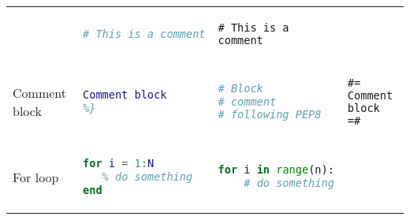 \documentclass[10pt, landscape]{article}
\begin{document}
\begin{multicols}{2}
\begin{tabular}[]{@{}llll@{}}
\begin{minipage}[t]{0.22\columnwidth}
\end{minipage} & \begin{minipage}[t]{0.22\columnwidth}\raggedright
\begin{lstlisting}[language=Python]
# This is a comment
\end{lstlisting}

\end{minipage} & \begin{minipage}[t]{0.25\columnwidth}\raggedright
\begin{lstlisting}
# This is a comment
\end{lstlisting}

\end{minipage}\tabularnewline
\begin{minipage}[t]{0.19\columnwidth}\raggedright
Comment block
\end{minipage} & \begin{minipage}[t]{0.22\columnwidth}\raggedright
\begin{lstlisting}[language=Matlab]
%{
Comment block
%}
\end{lstlisting}

\end{minipage} & \begin{minipage}[t]{0.22\columnwidth}\raggedright
\begin{lstlisting}[language=Python]
# Block
# comment
# following PEP8
\end{lstlisting}

\end{minipage} & \begin{minipage}[t]{0.25\columnwidth}\raggedright
\begin{lstlisting}
#=
Comment block
=#
\end{lstlisting}

\end{minipage}\tabularnewline
\begin{minipage}[t]{0.19\columnwidth}\raggedright
For loop
\end{minipage} & \begin{minipage}[t]{0.22\columnwidth}\raggedright
\begin{lstlisting}[language=Matlab]
for i = 1:N
   % do something
end
\end{lstlisting}

\end{minipage} & \begin{minipage}[t]{0.22\columnwidth}\raggedright
\begin{lstlisting}[language=Python]
for i in range(n):
    # do something
\end{lstlisting}


\end{minipage}
\end{tabular}
\end{multicols}
\end{document}
